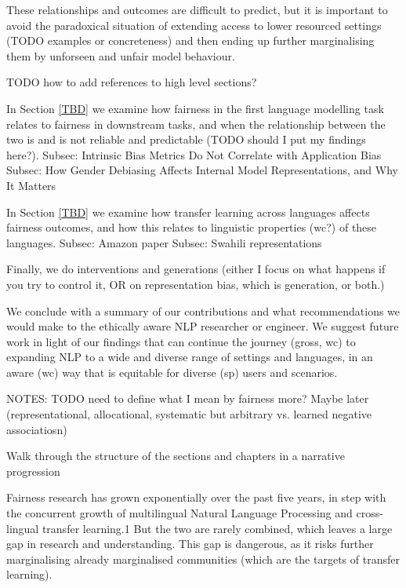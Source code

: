 These relationships and outcomes are difficult to predict, but it is important to avoid the paradoxical situation of extending access to lower resourced settings (TODO examples or concreteness) and then ending up further marginalising them by unforseen and unfair model behaviour. 


TODO how to add references to high level sections?

In Section \ref{TBD} we examine how fairness in the first language modelling task relates to fairness in downstream tasks, and when the relationship between the two is and is not reliable and predictable (TODO should I put my findings here?).
Subsec: Intrinsic Bias Metrics Do Not Correlate with Application Bias
Subsec: How Gender Debiasing Affects Internal Model Representations, and Why It Matters

In Section \ref{TBD} we examine how transfer learning across languages affects fairness outcomes, and how this relates to linguistic properties (wc?) of these languages.
Subsec: Amazon paper
Subsec: Swahili representations

Finally, we do interventions and generations (either I focus on what happens if you try to control it, OR on representation bias, which is generation, or both.)

We conclude with a summary of our contributions and what recommendations we would make to the ethically aware NLP researcher or engineer. We suggest future work in light of our findings that can continue the journey (gross, wc) to expanding NLP to a wide and diverse range of settings and languages, in an aware (wc) way that is equitable for diverse (sp) users and scenarios. 

NOTES:
TODO need to define what I mean by fairness more? Maybe later (representational, allocational, systematic but arbitrary vs. learned negative associatiosn)

Walk through the structure of the sections and chapters in a narrative progression





Fairness research has grown exponentially over the
past five years, in step with the concurrent growth
of multilingual Natural Language Processing
and cross-lingual transfer learning.1 But the
two are rarely combined, which leaves a large
gap in research and understanding. This gap is
dangerous, as it risks further marginalising already
marginalised communities (which are the targets of
transfer learning). 